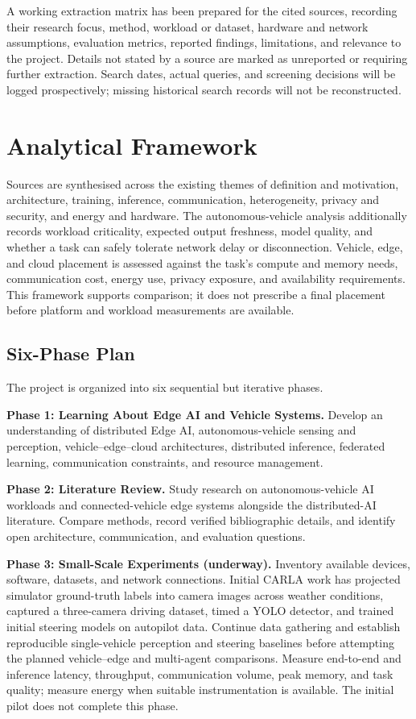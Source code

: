 \documentclass[12pt,a4paper,oneside]{report}
\begin{document}
A working extraction matrix has been prepared for the cited sources,
recording their research focus, method, workload or dataset, hardware and
network assumptions, evaluation metrics, reported findings, limitations,
and relevance to the project. Details not stated by a source are marked as
unreported or requiring further extraction. Search dates, actual queries,
and screening decisions will be logged prospectively; missing historical
search records will not be reconstructed.

\section{Analytical Framework}

Sources are synthesised across the existing themes of definition and
motivation, architecture, training, inference, communication, heterogeneity,
privacy and security, and energy and hardware. The autonomous-vehicle
analysis additionally records workload criticality, expected output
freshness, model quality, and whether a task can safely tolerate network
delay or disconnection. Vehicle, edge, and cloud placement is assessed
against the task's compute and memory needs, communication cost, energy
use, privacy exposure, and availability requirements. This framework
supports comparison; it does not prescribe a final placement before
platform and workload measurements are available.

\subsection{Six-Phase Plan}

The project is organized into six sequential but iterative phases.

\noindent\textbf{Phase 1: Learning About Edge AI and Vehicle Systems.}
Develop an understanding of distributed Edge AI, autonomous-vehicle
sensing and perception, vehicle--edge--cloud architectures, distributed
inference, federated learning, communication constraints, and resource
management.

\par\medskip
\noindent\textbf{Phase 2: Literature Review.}
Study research on autonomous-vehicle AI workloads and connected-vehicle
edge systems alongside the distributed-AI literature. Compare methods,
record verified bibliographic details, and identify open architecture,
communication, and evaluation questions.

\par\medskip
\noindent\textbf{Phase 3: Small-Scale Experiments (underway).} Inventory
available devices, software, datasets, and network connections. Initial
CARLA work has projected simulator ground-truth labels into camera images
across weather conditions, captured a three-camera driving dataset, timed a
YOLO detector, and trained initial steering models on autopilot data.
Continue data gathering and establish reproducible single-vehicle
perception and steering baselines before attempting the planned
vehicle--edge and multi-agent comparisons. Measure end-to-end and inference
latency, throughput, communication volume, peak memory, and task quality;
measure energy when suitable instrumentation is available. The initial
pilot does not complete this phase.
\end{document}
